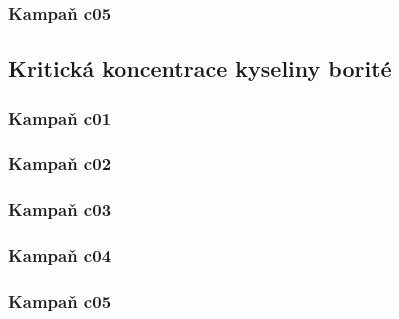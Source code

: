 \documentclass[a4paper,twoside,11pt]{article}
\begin{document}
\subsubsection{Kampaň c05}



\subsection{Kritická koncentrace kyseliny borité}

\subsubsection{Kampaň c01}


\subsubsection{Kampaň c02}


\subsubsection{Kampaň c03}


\subsubsection{Kampaň c04}


\subsubsection{Kampaň c05}

\end{document}
